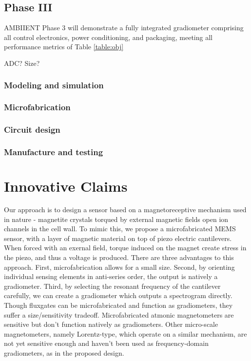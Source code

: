 \subsection{Phase III}
AMBIIENT Phase 3 will demonstrate a fully integrated gradiometer comprising all control
electronics, power conditioning, and packaging, meeting all performance metrics of Table  \ref{table:obj}


ADC? Size?
\subsubsection{Modeling and simulation}
\subsubsection{Microfabrication}
\subsubsection{Circuit design}
\subsubsection{Manufacture and testing}

\section{Innovative Claims}\label{sec:inno}

Our approach is to design a sensor based on a magnetoreceptive mechanism used in nature - magnetite crystals torqued by external magnetic fields open ion channels in the cell wall. To mimic this, we propose a microfabricated MEMS sensor, with a layer of magnetic material on top of piezo electric cantilevers. When forced with an exernal field, torque induced on the magnet create stress in the piezo, and thus a voltage is produced. There are three advantages to this approach. First, microfabrication allows for a small size. Second, by orienting individual sensing elements in anti-series order, the output is natively a gradiometer. Third, by selecting the resonant frequency of the cantilever carefully, we can create a gradiometer which outputs a spectrogram directly. Though fluxgates can be microfabricated and function as gradiometers, they suffer a size/sensitivity tradeoff. Microfabricated atmonic magnetometers are sensitive but don't function natively as gradiometers. Other micro-scale magnetometers, namely Lorentz-type, which operate on a similar mechanism, are not yet sensitive enough and haven't been used as frequency-domain gradiometers, as in the proposed design.

